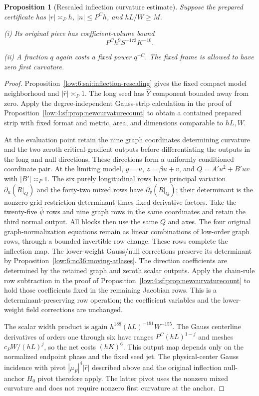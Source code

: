 \documentclass[11pt]{amsart}
\newtheorem{proposition}[theorem]{Proposition}
\theoremstyle{definition}
\theoremstyle{remark}
\numberwithin{equation}{section}
\begin{document}
\begin{proposition}[Rescaled inflection curvature estimate]\label{low:6:s36i:curvature}
Suppose the prepared certificate has $|r|\asymp_Ph$, $|n|\le P^Ch$, and $hL/W\ge M$.

\noindent\textup{(i)} Its original piece has coefficient-volume bound
\[
P^Ch^9S^{-173}K^{-10}.
\]

\noindent\textup{(ii)} A fraction $q$ again costs a fixed power $q^{-C}$. The fixed frame is allowed to have zero first curvature.
\end{proposition}
\begin{proof}
Proposition~\ref{low:6:sai:inflection-rescaling} gives the fixed compact model neighborhood and $|\widehat r|\asymp_P1$. The long seed has $\widehat Y$ component bounded away from zero. Apply the degree-independent Gauss-strip calculation in the proof of Proposition~\ref{low:4:sf:prop:newcurvaturecount} to obtain a contained prepared strip with fixed format and metric, area, and dimensions comparable to $hL,W$.

At the evaluation point retain the nine graph coordinates determining curvature and the two zeroth critical-gradient outputs before differentiating the outputs in the long and null directions. These directions form a uniformly conditioned coordinate pair. At the limiting model, $y=u$, $z=\beta u+v$, and $Q=A'u^2+B'uv$ with $|B'|\asymp_P1$. The six purely longitudinal rows have principal variation $\partial_u(R|_Q)$ and the forty-two mixed rows have $\partial_v(R|_Q)$; their determinant is the nonzero grid restriction determinant times fixed derivative factors. Take the twenty-five $\widehat\psi$ rows and nine graph rows in the same coordinates and retain the third normal output. All blocks then use the same $Q$ and axes. The four original graph-normalization equations remain as linear combinations of low-order graph rows, through a bounded invertible row change. These rows complete the inflection map. The lower-weight Gauss/null corrections preserve its determinant by Proposition~\ref{low:6:nc36:moving-atlases}. The direction coefficients are determined by the retained graph and zeroth scalar outputs. Apply the chain-rule row subtraction in the proof of Proposition~\ref{low:4:sf:prop:newcurvaturecount} to hold those coefficients fixed in the remaining Jacobian rows. This is a determinant-preserving row operation; the coefficient variables and the lower-weight field corrections are unchanged.

The scalar width product is again $h^{188}(hL)^{-191}W^{-155}$. The Gauss centerline derivatives of orders one through six have ranges $P^C(hL)^{1-j}$ and meshes $c_PW/(hL)^j$, so the net costs $(hK)^6$. This output map depends only on the normalized endpoint phase and the fixed seed jet. The physical-center Gauss incidence with pivot $|\mu_F|^4|\widehat r|$ described above and the original inflection null-anchor $H_0$ pivot therefore apply. The latter pivot uses the nonzero mixed curvature and does not require nonzero first curvature at the anchor.


\end{proof}
\end{document}
